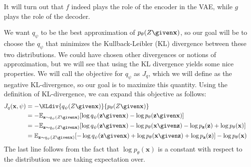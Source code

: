 It will turn out that $f$ indeed plays the role of the encoder in the VAE, while $g$ plays the role of the decoder.

We want $q_{\psi}$ to be the best approximation of $p_{\theta}(Z \given \mathbf{x})$, so our goal will be to choose the $q_{\psi}$ that minimizes the Kullback-Leibler (KL) divergence between these two distributions. We could have chosen other divergences or notions of approximation, but we will see that using the KL divergence yields some nice properties. We will call the objective for $q_{\psi}$ as $J_{q}$, which we will define as the negative KL-divergence, so our goal is to maximize this quantity. Using the definition of KL-divergence, we can expand this objective as follows: %
\begin{align}
    J_q(\mathbf{x},\psi) &= -\KLdiv{q_{\psi}(Z \given \mathbf{x})}{p_{\theta}(Z \given \mathbf{x})}\\
    &= -\mathbb{E}_{\mathbf{z} \sim q_{\psi}(Z \given \mathbf{x})}[ \log q_{\psi}(\mathbf{z} \given \mathbf{x}) - \log p_{\theta}(\mathbf{z} \given \mathbf{x})]\\
    &= -\mathbb{E}_{\mathbf{z} \sim q_{\psi}(Z \given \mathbf{x})}[ \log q_{\psi}(\mathbf{z} \given \mathbf{x}) - \log p_{\theta}(\mathbf{x} \given \mathbf{z}) - \log p_{\mathbf{z}}(\mathbf{z}) + \log p_{\theta}(\mathbf{x})]\\
    &= \mathbb{E}_{\mathbf{z} \sim q_{\psi}(Z \given \mathbf{x})}[ -\log q_{\psi}(\mathbf{z} \given \mathbf{x}) + \log p_{\theta}(\mathbf{x} \given \mathbf{z}) + \log p_{\mathbf{z}}(\mathbf{z})] - \log p_{\theta}(\mathbf{x})
\end{align}
The last line follows from the fact that $\log p_{\theta}(\mathbf{x})$ is a constant with respect to the distribution we are taking expectation over.

